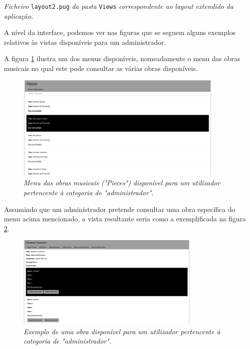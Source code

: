\begin{center}
\textit{Ficheiro} \texttt{layout2.pug} \textit{da pasta} \texttt{Views} \textit{correspondente ao layout extendido da aplicação.}
\end{center}


A nível da interface, podemos ver nas figuras que se seguem alguns exemplos relativos às vistas disponíveis para um administrador.

A figura \ref{fig:menuObras} ilustra um dos menus disponíveis, nomeadamente o menu das obras musicais no qual este pode consultar as várias obras disponíveis.

\begin{figure}[H]
\begin{center}
    \includegraphics[width = 0.9\textwidth, keepaspectratio]{imgs/piecesMenu.png}
    \caption{\textit{Menu das obras musicais ("Pieces") disponível para um utilizador pertencente à categoria de "administrador".}}
    \label{fig:menuObras}
\end{center}
\end{figure}

Assumindo que um administrador pretende consultar uma obra específica do menu acima mencionado, a vista resultante seria como a exemplificada na figura \ref{fig:umaObra}. 

\begin{figure}[H]
\begin{center}
    \includegraphics[width = 0.8\textwidth, keepaspectratio]{imgs/onePiece.png}
    \caption{\textit{Exemplo de uma obra disponível para um utilizador pertencente à categoria de "administrador".}}
    \label{fig:umaObra}
\end{center}
\end{figure}

